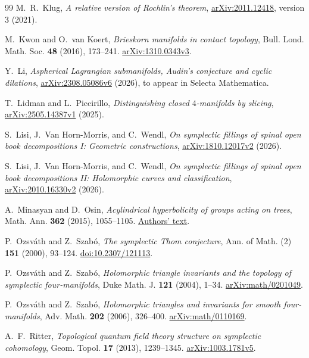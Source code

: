 \documentclass[11pt]{amsart}
\theoremstyle{definition}
\theoremstyle{remark}
\begin{document}
\begin{thebibliography}{99}
M.~R.~Klug, \emph{A relative version of Rochlin's theorem},
\href{https://arxiv.org/abs/2011.12418}{arXiv:2011.12418},
version 3 (2021).

M.~Kwon and O.~van Koert, \emph{Brieskorn manifolds in contact topology},
Bull. Lond. Math. Soc. \textbf{48} (2016), 173--241.
\href{https://arxiv.org/abs/1310.0343v3}{arXiv:1310.0343v3}.

Y.~Li, \emph{Aspherical Lagrangian submanifolds, Audin's
conjecture and cyclic dilations},
\href{https://arxiv.org/abs/2308.05086v6}{arXiv:2308.05086v6}
(2026), to appear in Selecta Mathematica.

T.~Lidman and L.~Piccirillo, \emph{Distinguishing closed
$4$-manifolds by slicing},
\href{https://arxiv.org/abs/2505.14387v1}{arXiv:2505.14387v1} (2025).

S.~Lisi, J.~Van Horn-Morris, and C.~Wendl, \emph{On symplectic fillings
of spinal open book decompositions I: Geometric constructions},
\href{https://arxiv.org/abs/1810.12017v2}{arXiv:1810.12017v2} (2026).

S.~Lisi, J.~Van Horn-Morris, and C.~Wendl, \emph{On symplectic fillings
of spinal open book decompositions II: Holomorphic curves and classification},
\href{https://arxiv.org/abs/2010.16330v2}{arXiv:2010.16330v2} (2026).

A.~Minasyan and D.~Osin, \emph{Acylindrical hyperbolicity of groups
acting on trees}, Math. Ann. \textbf{362} (2015), 1055--1105.
\href{https://www.personal.soton.ac.uk/am4x07/rs/acyl-trees.pdf}{Authors' text}.

P.~Ozsv\'ath and Z.~Szab\'o, \emph{The symplectic Thom conjecture},
Ann. of Math. (2) \textbf{151} (2000), 93--124.
\href{https://doi.org/10.2307/121113}{doi:10.2307/121113}.

P.~Ozsv\'ath and Z.~Szab\'o, \emph{Holomorphic triangle invariants
and the topology of symplectic four-manifolds}, Duke Math. J.
\textbf{121} (2004), 1--34.
\href{https://arxiv.org/abs/math/0201049}{arXiv:math/0201049}.

P.~Ozsv\'ath and Z.~Szab\'o, \emph{Holomorphic triangles and
invariants for smooth four-manifolds}, Adv. Math. \textbf{202}
(2006), 326--400.
\href{https://arxiv.org/abs/math/0110169}{arXiv:math/0110169}.

A.~F.~Ritter, \emph{Topological quantum field theory structure
on symplectic cohomology}, Geom. Topol. \textbf{17} (2013),
1239--1345.
\href{https://arxiv.org/abs/1003.1781v5}{arXiv:1003.1781v5}.


\end{thebibliography}
\end{document}
